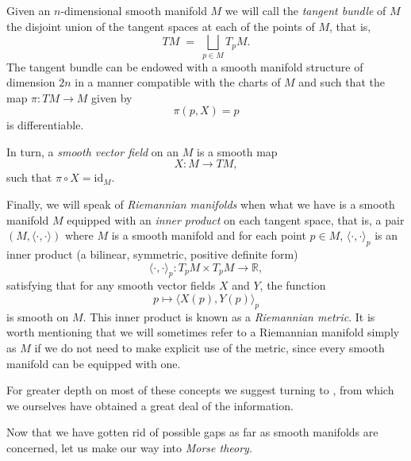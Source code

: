 Given an $n$-dimensional smooth manifold $M$ we will call the \textit{tangent bundle} of $M$ the disjoint union of the tangent spaces at each of the points of $M$, that is,
\[
TM \;=\; \bigsqcup_{p \in M} T_pM.
\]
The tangent bundle can be endowed with a smooth manifold structure of dimension $2n$ in a manner compatible with the charts of $M$ and such that the map $\pi: TM\to M$ given by
\[
\pi(p,X)=p
\]
is differentiable.

In turn, a \textit{smooth vector field} on an $M$ is a smooth map
\[
X \colon M \to TM,
\]
such that $\pi\circ X=\text{id}_M$.

\bigskip

Finally, we will speak of \textit{Riemannian manifolds} when what we have is a smooth manifold $M$ equipped with an \textit{inner product} on each tangent space, that is, a pair $(M,\langle\cdot,\cdot\rangle)$ where $M$ is a smooth manifold and for each point $p \in M$, $\langle\cdot,\cdot\rangle_p$ is an inner product (a bilinear, symmetric, positive definite form)
  \[
    \langle\cdot,\cdot\rangle_p \colon T_pM \times T_pM \to \mathbb{R},
  \]
satisfying that for any smooth vector fields $X$ and $Y$, the function
  \[
    p \mapsto \langle X(p), Y(p) \rangle_p
  \]
is smooth on $M$. This inner product is known as a \textit{Riemannian metric}. It is worth mentioning that we will sometimes refer to a Riemannian manifold simply as $M$ if we do not need to make explicit use of the metric, since every smooth manifold can be equipped with one.

\bigskip

For greater depth on most of these concepts we suggest turning to \cite{GonzalezPrietoVariedades}, from which we ourselves have obtained a great deal of the information.

Now that we have gotten rid of possible gaps as far as smooth manifolds are concerned, let us make our way into \textit{Morse theory}.
